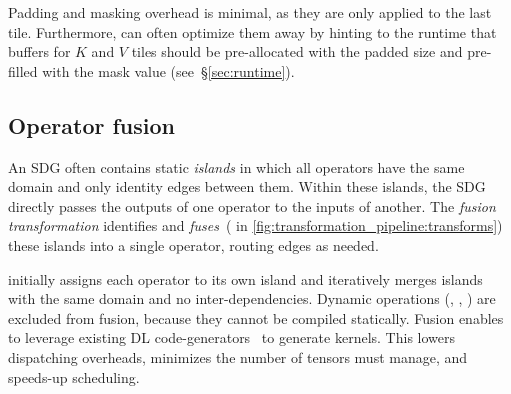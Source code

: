 Padding and masking overhead is minimal, as they are only applied to the last tile. Furthermore, \sys{} can often optimize them away by hinting to the runtime that buffers for $K$ and $V$ tiles should be pre-allocated with the padded size and pre-filled with the mask value (see~\S\ref{sec:runtime}).



\subsection{Operator fusion}
\label{sec:dataflow_fusion}

An SDG often contains static \emph{islands} in which all operators have the same domain and only identity edges between them. Within these islands, the SDG directly passes the outputs of one operator to the inputs of another. The \emph{fusion transformation} identifies and \emph{fuses}~( in \F\ref{fig:transformation_pipeline:transforms}) these islands into a single  operator, routing edges as needed. 

\sys{} initially assigns each operator to its own island and iteratively merges islands with the same domain and no inter-dependencies.
Dynamic operations (\eg {}, , ) are excluded from fusion, because they cannot be compiled statically. Fusion enables \sys{} to leverage existing DL code-generators~\cite{frostig2018compiling, ansel2024pytorch, tillet2019triton} to generate kernels. This lowers dispatching overheads, minimizes the number of tensors \sys{} must manage, and speeds-up scheduling.



